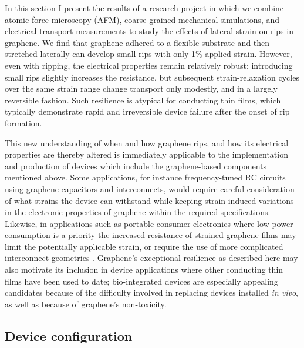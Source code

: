 \documentclass[edeposit,fullpage,draftthesis]{uiucthesis2009}
\begin{document}
        
        In this section I present the results of a research project in which 
        we combine atomic force microscopy (AFM), coarse-grained
        mechanical simulations, and electrical transport measurements to study the
        effects of lateral strain on rips in graphene. We find that graphene adhered to
        a flexible substrate and then stretched laterally can develop small rips with
        only 1\% applied strain. However, even with ripping, the electrical properties
        remain relatively robust: introducing small rips slightly increases the
        resistance, but subsequent strain-relaxation cycles over the same strain range
        change transport only modestly, and in a largely reversible fashion. Such
        resilience is atypical for conducting thin films, which typically demonstrate
        rapid and irreversible device failure after the onset of rip
        formation\cite{Cairns2000,Fortunato2002}.
    
        This new understanding of when and how graphene rips, and how its electrical
        properties are thereby altered is immediately applicable to the implementation
        and production of devices which include the graphene-based components mentioned
        above. Some applications, for instance frequency-tuned RC circuits using
        graphene capacitors and interconnects, would require careful consideration of
        what strains the device can withstand while keeping strain-induced variations
        in the electronic properties of graphene within the required specifications.
        Likewise, in applications such as portable consumer electronics where low power
        consumption is a priority the increased resistance of strained graphene films
        may limit the potentially applicable strain, or require the use of more
        complicated interconnect geometries \cite{Kim2011}. Graphene's exceptional
        resilience as described here may also motivate its inclusion in device
        applications where other conducting thin films have been used to date;
        bio-integrated devices \cite{viventi2010conformal} are especially appealing candidates
        because of the difficulty involved in replacing devices installed \textit{in
        vivo}, as well as because of graphene's non-toxicity.
       
    \subsection{Device configuration}
    
\end{document}
